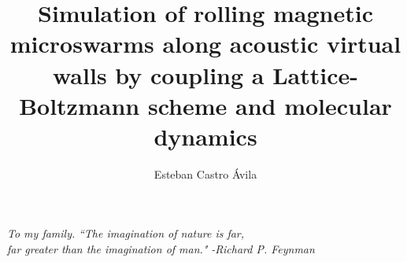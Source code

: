 \documentclass[titlepage]{ucbthesis}
\begin{document}
\renewcommand{\figurename}{Fig.}
\renewcommand{\tablename}{Chart}
\renewcommand{\listtablename}{chart index}
\setlength{\abovecaptionskip}{10pt}
\setlength{\belowcaptionskip}{10pt}

\title{Simulation of rolling magnetic microswarms along acoustic virtual walls by coupling a Lattice-Boltzmann scheme and molecular dynamics}
\author{Esteban Castro Ávila}


\maketitle
\makesubtitle


\begin{frontmatter}

\begin{dedication}
\begin{flushright}
\begin{vplace}
\textit{To my family.}
\vspace{3cm}
\textit{``The imagination of nature is far,\\
far greater than the imagination of man."}
\vspace{0.1cm}
\textit{-Richard P. Feynman}
\end{vplace}
\end{flushright}
\end{dedication}






\tableofcontents
\clearpage
\listoffigures
\clearpage
\listoftables

\end{frontmatter}
\end{document}
